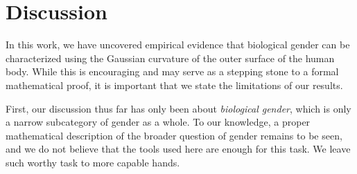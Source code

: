 \documentclass[11pt]{article}
\begin{document}
\section{Discussion}

In this work, we have uncovered empirical evidence that biological gender can be characterized using the Gaussian curvature of the outer surface of the human body. While this is encouraging and may serve as a stepping stone to a formal mathematical proof, it is important that we state the limitations of our results.

First, our discussion thus far has only been about \textit{biological gender}, which is only a narrow subcategory of gender as a whole. To our knowledge, a proper mathematical description of the broader question of gender remains to be seen, and we do not believe that the tools used here are enough for this task. We leave such worthy task to more capable hands.

 

\end{document}
